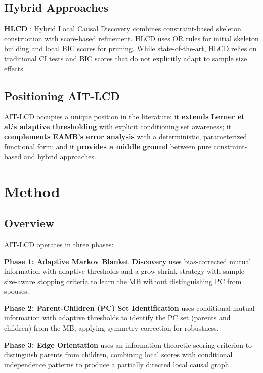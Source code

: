 \documentclass{article}
\theoremstyle{plain}
\theoremstyle{definition}
\begin{document}
\subsection{Hybrid Approaches}

\textbf{HLCD} \citep{ling2025hybrid}: Hybrid Local Causal Discovery combines constraint-based skeleton construction with score-based refinement. HLCD uses OR rules for initial skeleton building and local BIC scores for pruning. While state-of-the-art, HLCD relies on traditional CI tests and BIC scores that do not explicitly adapt to sample size effects.

\subsection{Positioning AIT-LCD}

AIT-LCD occupies a unique position in the literature: it \textbf{extends Lerner et al.'s adaptive thresholding} with explicit conditioning set awareness; it \textbf{complements EAMB's error analysis} with a deterministic, parameterized functional form; and it \textbf{provides a middle ground} between pure constraint-based and hybrid approaches.

\section{Method}\label{sec:method}

\subsection{Overview}

AIT-LCD operates in three phases:

\textbf{Phase 1: Adaptive Markov Blanket Discovery} uses bias-corrected mutual information with adaptive thresholds and a grow-shrink strategy with sample-size-aware stopping criteria to learn the MB without distinguishing PC from spouses.

\textbf{Phase 2: Parent-Children (PC) Set Identification} uses conditional mutual information with adaptive thresholds to identify the PC set (parents and children) from the MB, applying symmetry correction for robustness.

\textbf{Phase 3: Edge Orientation} uses an information-theoretic scoring criterion to distinguish parents from children, combining local scores with conditional independence patterns to produce a partially directed local causal graph.
\end{document}

